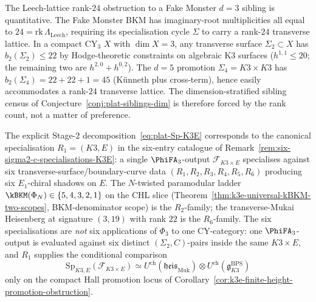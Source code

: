 \begin{remark}[Rank obstruction to Fake Monster at \texorpdfstring{$d = 3$}{d = 3}]
\label{rem:k3e-platonic-fake-monster-rank-obstruction}
The Leech-lattice rank-$24$ obstruction to a Fake Monster $d = 3$ sibling is quantitative. The Fake Monster BKM has imaginary-root multiplicities all equal to $24 = \mathrm{rk}\,\Lambda_{\mathrm{Leech}}$, requiring its specialisation cycle $\Sigma$ to carry a rank-$24$ transverse lattice. In a compact CY$_3$ $X$ with $\dim X = 3$, any transverse surface $\Sigma_2 \subset X$ has $b_2(\Sigma_2) \leq 22$ by Hodge-theoretic constraints on algebraic K3 surfaces ($h^{1, 1} \leq 20$; the remaining two are $h^{2, 0} + h^{0, 2}$). The $d = 5$ promotion $\Sigma_4 = K3 \times K3$ has $b_2(\Sigma_4) = 22 + 22 + 1 = 45$ (K\"unneth plus cross-term), hence easily accommodates a rank-$24$ transverse lattice. The dimension-stratified sibling census of Conjecture~\ref{conj:plat-siblings-dim} is therefore forced by the rank count, not a matter of preference.
\end{remark}

\begin{remark}
\label{rem:k3e-platonic-six-specialisations-crossref}
The explicit Stage-$2$ decomposition~\eqref{eq:plat-Sp-K3E} corresponds to the canonical specialisation $R_1 = (K3, E)$ in the six-entry catalogue of Remark~\ref{rem:six-sigma2-c-specialisations-K3E}: a single $\PhiFA_3$-output $\mathcal{F}_{K3 \times E}$ specialises against six transverse-surface/boundary-curve data $(R_1, R_2, R_3, R_4, R_5, R_6)$ producing six $E_1$-chiral shadows on $E$. The $N$-twisted paramodular ladder $\kBKM(\Phi_N) \in \{5, 4, 3, 2, 1\}$ on the CHL slice (Theorem~\ref{thm:k3e-universal-kBKM-two-scopes}, BKM-denominator scope) is the $R_2$-family; the transverse-Mukai Heisenberg at signature $(3, 19)$ with rank $22$ is the $R_6$-family. The six specialisations are \emph{not} six applications of $\Phi_3$ to one CY-category: one $\PhiFA_3$-output is evaluated against six distinct $(\Sigma_2, C)$-pairs inside the same $K3 \times E$, and $R_1$ supplies the conditional comparison
\[
\mathrm{Sp}_{K3, E}(\mathcal{F}_{K3 \times E})
\simeq
U^{\mathrm{ch}}(\mathfrak{heis}_{\mathrm{Muk}})
\otimes
U^{\mathrm{ch}}(\mathfrak{g}^{\mathrm{BPS}}_{K3})
\]
only on the compact Hall promotion locus of
Corollary~\ref{cor:k3e-finite-height-promotion-obstruction}.
\end{remark}

